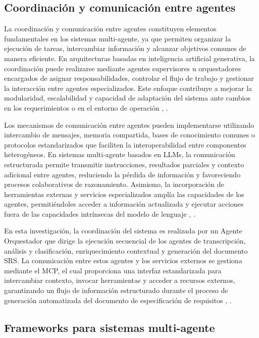 \subsection{Coordinación y comunicación entre agentes}

La coordinación y comunicación entre agentes constituyen elementos fundamentales en los sistemas multi-agente, ya que permiten organizar 
la ejecución de tareas, intercambiar información y alcanzar objetivos comunes de manera eficiente. En arquitecturas basadas en inteligencia 
artificial generativa, la coordinación puede realizarse mediante agentes supervisores u orquestadores encargados de asignar responsabilidades, 
controlar el flujo de trabajo y gestionar la interacción entre agentes especializados. Este enfoque contribuye a mejorar la modularidad, 
escalabilidad y capacidad de adaptación del sistema ante cambios en los requerimientos o en el entorno de operación \cite{Guo2024}, \cite{xi2025rise}.

Los mecanismos de comunicación entre agentes pueden implementarse utilizando intercambio de mensajes, memoria compartida, bases de conocimiento 
comunes o protocolos estandarizados que faciliten la interoperabilidad entre componentes heterogéneos. En sistemas multi-agente basados en LLMs, 
la comunicación estructurada permite transmitir instrucciones, resultados parciales y contexto adicional entre agentes, reduciendo la pérdida de 
información y favoreciendo procesos colaborativos de razonamiento. Asimismo, la incorporación de herramientas externas y servicios especializados 
amplía las capacidades de los agentes, permitiéndoles acceder a información actualizada y ejecutar acciones fuera de las capacidades intrínsecas 
del modelo de lenguaje \cite{Guo2024}, \cite{durante2024agent}.

En esta investigación, la coordinación del sistema es realizada por un Agente Orquestador que dirige la ejecución secuencial de los agentes de 
transcripción, análisis y clasificación, enriquecimiento contextual y generación del documento SRS. La comunicación entre estos agentes y los 
servicios externos se gestiona mediante el MCP, el cual proporciona una interfaz estandarizada para intercambiar contexto, 
invocar herramientas y acceder a recursos externos, garantizando un flujo de información estructurado durante el proceso de generación automatizada 
del documento de especificación de requisitos \cite{xi2025rise}, \cite{zhang2025survey}.

\subsection{Frameworks para sistemas multi-agente}


